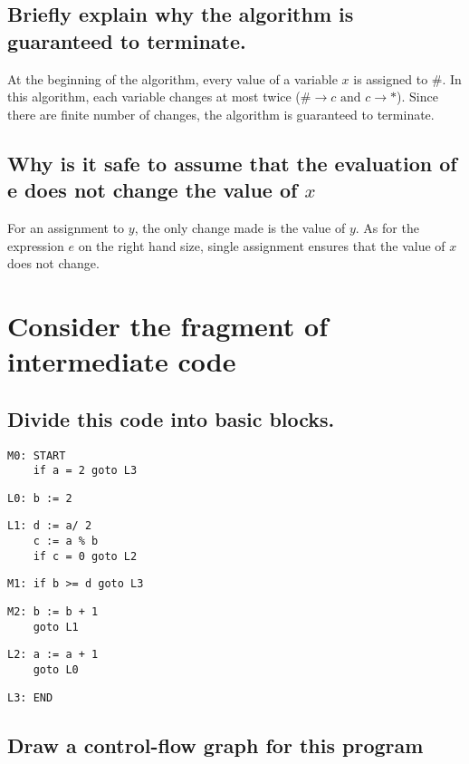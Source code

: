 \documentclass[11pt]{article}
\begin{document}
\subsection{Briefly explain why the algorithm is guaranteed to terminate.}
At the beginning of the algorithm, every value of a variable $x$ is assigned to $\#$. In this algorithm, each variable changes at most twice ($\# \rightarrow c \text{ and } c \rightarrow *$). Since there are finite number of changes, the algorithm is guaranteed to terminate.  

\subsection{Why is it safe to assume that the evaluation of e does not change the value of $x$}
For an assignment to $y$, the only change made is the value of $y$. As for the expression $e$ on the right hand size, single assignment ensures that the value of $x$ does not change.

\setcounter{subsection}{0}

\section{Consider the fragment of intermediate code}

\subsection{Divide this code into basic blocks.}
\begin{lstlisting}
M0: START 
    if a = 2 goto L3
\end{lstlisting}
\begin{lstlisting}
L0: b := 2
\end{lstlisting}
\begin{lstlisting}
L1: d := a/ 2
    c := a % b
    if c = 0 goto L2
\end{lstlisting}
\begin{lstlisting}
M1: if b >= d goto L3
\end{lstlisting}
\begin{lstlisting}
M2: b := b + 1
    goto L1
\end{lstlisting}
\begin{lstlisting}
L2: a := a + 1
    goto L0
\end{lstlisting}
\begin{lstlisting}
L3: END
\end{lstlisting}

\subsection{Draw a control-flow graph for this program}
\end{document}
